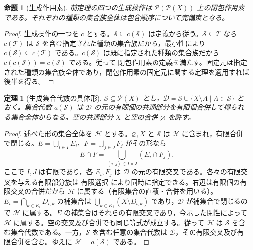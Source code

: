 \documentclass[a5paper,10pt,dvipdfmx]{jsarticle}
\theoremstyle{definition}
\theoremstyle{plain}
\newtheorem{prop}[ruledef]{命題}
\newtheorem{thm}[ruledef]{定理}
\newcommand{\Pow}{\mathcal{P}}
\newcommand{\GenronRefText}[2]{#2}
\begin{document}
\begin{prop}[生成作用素]\label{k188}
前定理の四つの生成操作は $\Pow(\Pow(X))$ 上の閉包作用素である。それぞれの種類の集合族全体は包含順序について完備束となる。
\end{prop}
\begin{proof}
生成操作の一つを $c$ とする。$\mathcal S\subseteq c(\mathcal S)$ は定義から従う。$\mathcal S\subseteq\mathcal T$ なら $c(\mathcal T)$ は $\mathcal S$ を含む指定された種類の集合族だから，最小性により $c(\mathcal S)\subseteq c(\mathcal T)$ である。$c(\mathcal S)$ は既に指定された種類の集合族だから $c(c(\mathcal S))=c(\mathcal S)$ である。従って \GenronRefText{K-000091}{閉包作用素の定義}を満たす。固定元は指定された種類の集合族全体であり，\GenronRefText{K-000092}{閉包作用素の固定元に関する定理}を適用すれば後半を得る。
\end{proof}
\begin{thm}[生成集合代数の具体形]\label{k189}
$\mathcal S\subseteq\Pow(X)$ とし，$\mathcal D=\mathcal S\cup\{X\setminus A\mid A\in\mathcal S\}$ とおく。集合代数 $a(\mathcal S)$ は $\mathcal D$ の元の有限個の共通部分を有限個合併して得られる集合全体からなる。空の共通部分 $X$ と空の合併 $\varnothing$ を許す。
\end{thm}
\begin{proof}
述べた形の集合全体を $\mathcal H$ とする。$\varnothing,X$ と $\mathcal S$ は $\mathcal H$ に含まれ，有限合併で閉じる。$E=\bigcup_{i\in I}E_i$，$F=\bigcup_{j\in J}F_j$ がその形なら
\[E\cap F=\bigcup_{(i,j)\in I\times J}(E_i\cap F_j).\]
ここで $I,J$ は有限であり，各 $E_i,F_j$ は $\mathcal D$ の元の有限交叉である。各々の有限交叉を与える有限部分族は \GenronRefText{K-000119}{有限選択} により同時に指定できる。右辺は有限個の有限交叉の合併だから $\mathcal H$ に属する（有限集合の直積・合併を用いる）。$E_i=\bigcap_{k\in K_i}D_{i,k}$ の補集合は $\bigcup_{k\in K_i}(X\setminus D_{i,k})$ であり，$\mathcal D$ が補集合で閉じるので $\mathcal H$ に属する。$E$ の補集合はそれらの有限交叉であり，今示した閉性によって $\mathcal H$ に属する。空の交叉及び合併でも同じ等式が成立する。従って $\mathcal H$ は $\mathcal S$ を含む集合代数である。一方，$\mathcal S$ を含む任意の集合代数は $\mathcal D$，その有限交叉及び有限合併を含む。ゆえに $\mathcal H=a(\mathcal S)$ である。
\end{proof}
\end{document}
